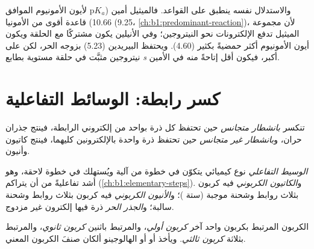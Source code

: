 والاستدلال نفسه ينطبق على القواعد. فالميثيل أمين ($\mathrm{p}K_a$ لأيون
الأمونيوم الموافق 10.66) قاعدة أقوى من الأمونيا (9.25، \cref{ch:b1:predominant-reaction})،
لأن مجموعة الميثيل تدفع الإلكترونات نحو النيتروجين؛ وفي الأنيلين يكون 
مشتركًا مع الحلقة ويكون أيون الأمونيوم أكثر حمضيةً بكثير (4.60).
ويحتفظ البيريدين (5.23) بزوجه الحر، لكن على نيتروجين مثبَّت في حلقة
مستوية بطابع \textit{s} أكبر، فيكون أقل إتاحةً منه في الأمين.

\section{كسر رابطة: الوسائط التفاعلية}

\begin{definition}\label{def:b1:electronic-effects:cleavage}
تنكسر  \emph{بانشطار متجانس} حين تحتفظ كل ذرة
بواحد من إلكتروني الرابطة، فينتج جذران حران،
و\emph{بانشطار غير متجانس} حين تحتفظ ذرة واحدة بالإلكترونين كليهما، فينتج
كاتيون وأنيون.
\end{definition}

\begin{definition}\label{def:b1:electronic-effects:intermediates}
\emph{الوسيط التفاعلي} نوع كيميائي
يتكوّن في خطوة من آلية ويُستهلك في خطوة لاحقة، وهو أشد
تفاعليةً من أن يتراكم (\cref{ch:b1:elementary-steps}).
و\emph{الكاتيون الكربوني} فيه كربون بثلاث روابط
وشحنة موجبة (ستة )؛
و\emph{الأنيون الكربوني} فيه كربون بثلاث روابط 
وشحنة سالبة؛ و\emph{الجذر الحر} ذرة فيها
إلكترون غير مزدوج.
\end{definition}

\begin{definition}\label{def:b1:electronic-effects:carbon-class}
الكربون المرتبط بكربون واحد آخر \emph{كربون
أولي}، والمرتبط باثنين \emph{كربون
ثانوي}، والمرتبط بثلاثة \emph{كربون
ثالثي}. ويأخذ  أو  أو
الهالوجينو ألكان صنفَ الكربون المعني.
\end{definition}

